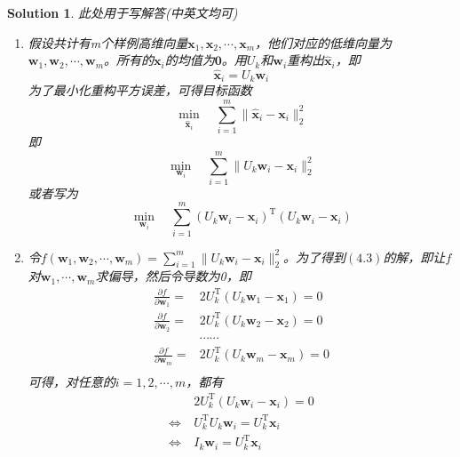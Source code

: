 \documentclass[a4paper,UTF8]{article}
\numberwithin{equation}{section}
\newtheorem*{mySol}{Solution}
\begin{document}
\begin{mySol}
	此处用于写解答(中英文均可)
\begin{enumerate}[(1)]
\item 
假设共计有m个样例高维向量$\mathbf{x}_1,\mathbf{x}_2,\cdots,\mathbf{x}_m$，他们对应的低维向量为$\mathbf{w}_1,\mathbf{w}_2,\cdots,\mathbf{w}_m$。所有的$\mathbf{x}_i$的均值为$\mathbf{0}$。用$U_k$和$\mathbf{w}_i$重构出$\hat{\mathbf{x}}_i$，即
\begin{equation}
\hat{\mathbf{x}}_i = U_k\mathbf{w}_i
\end{equation}
为了最小化重构平方误差，可得目标函数
\begin{equation}
\min_{\hat{\mathbf{x}}_i} \quad \sum_{i=1}^{m}\lVert \hat{\mathbf{x}}_i - \mathbf{x}_i\rVert_2^2	
\end{equation}
即
\begin{equation}
\min_{\mathbf{w}_i} \quad \sum_{i=1}^{m}\lVert U_k\mathbf{w}_i - \mathbf{x}_i\rVert_2^2	
\end{equation}
或者写为
\begin{equation}
\min_{\mathbf{w}_i} \quad \sum_{i=1}^{m}(U_k\mathbf{w}_i - \mathbf{x}_i)^\mathrm{T}(U_k\mathbf{w}_i - \mathbf{x}_i)
\end{equation}
\item 
令$f(\mathbf{w}_1,\mathbf{w}_2,\cdots,\mathbf{w}_m)=\sum_{i=1}^{m}\lVert U_k\mathbf{w}_i - \mathbf{x}_i\rVert_2^2$。为了得到$(4.3)$的解，即让$f$对$\mathbf{w}_1,\cdots,\mathbf{w}_m$求偏导，然后令导数为0，即
\begin{equation}
\begin{aligned}
\frac{\partial f}{\partial \mathbf{w}_1} =& 2U_k^\mathrm{T}(U_k\mathbf{w}_1 - \mathbf{x}_1)=0\\
\frac{\partial f}{\partial \mathbf{w}_2} =& 2U_k^\mathrm{T}(U_k\mathbf{w}_2 - \mathbf{x}_2)=0\\
&\cdots\cdots\\
\frac{\partial f}{\partial \mathbf{w}_m} =& 2U_k^\mathrm{T}(U_k\mathbf{w}_m - \mathbf{x}_m)=0\\
\end{aligned}
\end{equation}
可得，对任意的$i=1,2,\cdots,m$，都有
\begin{equation}
\begin{aligned}
&2U_k^\mathrm{T}(U_k\mathbf{w}_i - \mathbf{x}_i)=0\\
\Leftrightarrow\ &U_k^\mathrm{T}U_k\mathbf{w}_i = U_k^\mathrm{T}\mathbf{x}_i\\
\Leftrightarrow\ &I_k\mathbf{w}_i = U_k^\mathrm{T}\mathbf{x}_i\\

\end{aligned}
\end{equation}
\end{enumerate}
\end{mySol}
\end{document}
